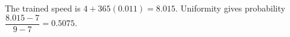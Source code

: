 The trained speed is $4+365(0.011)=\boxed{8.015}$. Uniformity gives probability $\dfrac{8.015-7}{9-7}=\boxed{0.5075}$.
